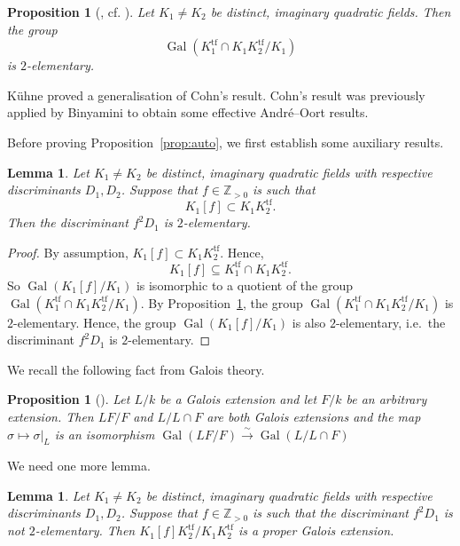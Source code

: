 \documentclass[12pt,a4paper,oneside]{amsart}
\newtheorem{lemma}[theorem]{Lemma}
\newtheorem{proposition}[theorem]{Proposition}
\DeclareMathOperator{\gal}{Gal}
\begin{document}
\begin{proposition}[{\cite[Th. 8.3.12]{Cohn94}}, cf. {\cite[Cor.~1.2]{Kuhne21}}]\label{prop:Cohn}
	Let $K_1 \neq K_2$ be distinct, imaginary quadratic fields. Then the group
	\[ \gal(K_1^\mathrm{tf} \cap K_1 K_2^\mathrm{tf} / K_1) \]
is $2$-elementary.
\end{proposition}

K\"uhne \cite{Kuhne21} proved a generalisation of Cohn's result. Cohn's result was previously applied by Binyamini \cite[\S2.3]{Binyamini19} to obtain some effective Andr\'e--Oort results.




Before proving Proposition~\ref{prop:auto}, we first establish some auxiliary results.

\begin{lemma}\label{lem:classfield1}
	Let $K_1 \neq K_2$ be distinct, imaginary quadratic fields with respective discriminants $D_1, D_2$. Suppose that $f \in \mathbb{Z}_{>0}$ is such that
	\[ K_1[f] \subset K_1 K_2^\mathrm{tf}.\]
	Then the discriminant $f^2 D_1$ is $2$-elementary.
\end{lemma}

\begin{proof}
	By assumption, $K_1[f] \subset K_1 K_2^\mathrm{tf}$. Hence,
	\[ K_1[f] \subseteq K_1^\mathrm{tf} \cap K_1 K_2^\mathrm{tf}.\]
So $\gal(K_1[f]/K_1)$ is isomorphic to a quotient of the group $\gal(K_1^\mathrm{tf} \cap K_1 K_2^\mathrm{tf} / K_1)$. By Proposition~\ref{prop:Cohn}, the group $\gal(K_1^\mathrm{tf} \cap K_1 K_2^\mathrm{tf} / K_1)$ is $2$-elementary. Hence, the group $\gal(K_1[f]/K_1)$ is also $2$-elementary, i.e.~the discriminant $f^2 D_1$ is $2$-elementary. 
\end{proof}

We recall the following fact from Galois theory.

\begin{proposition}[{\cite[Th.~VI.1.12]{Lang02}}]\label{prop:Lang}
	Let $L / k$ be a Galois extension and let $F / k$ be an arbitrary extension. Then $LF / F$ and $L / L \cap F$ are both Galois extensions and the map $\sigma \mapsto \sigma |_L$ is an isomorphism $\gal(LF/ F) \xrightarrow{\sim} \gal(L / L \cap F)$
\end{proposition} 

We need one more lemma.

\begin{lemma}\label{lem:classfield2}
	Let $K_1 \neq K_2$ be distinct, imaginary quadratic fields with respective discriminants $D_1, D_2$. Suppose that $f \in \mathbb{Z}_{>0}$ is such that the discriminant $f^2 D_1$ is not $2$-elementary. Then $K_1[f] K_2^\mathrm{tf} / K_1 K_2^\mathrm{tf}$ is a proper Galois extension.
\end{lemma}
\end{document}
